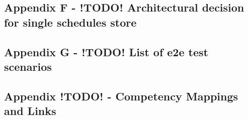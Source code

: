   \newpage
  \subsection{Appendix F - !TODO! Architectural decision for single schedules store}
  \label{sec:AppendixF}


  \newpage
  \subsection{Appendix G - !TODO! List of e2e test scenarios}
    \label{sec:AppendixG}
    
  


  
  \newpage
  \subsection{Appendix !TODO! - Competency Mappings and Links}
